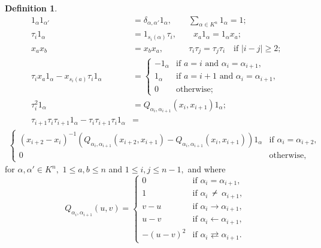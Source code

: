 \documentclass[11pt, reqno]{amsart} \textwidth=14.9cm \oddsidemargin=1cm \evensidemargin=1cm
\theoremstyle{definition}
\newtheorem{definition}[theorem]{Definition}
\def\nslash{\:\notslash\:}
\numberwithin{equation}{section}
\begin{document}
\begin{definition}
\begin{align}
1_{\alpha}1_{\alpha'}&=\delta_{\alpha,\alpha'}1_{\alpha},\qquad\sum_{\alpha\in K^{n}}1_{\alpha}=1;\label{rel-def-QHA1}\\[0.2em]
\tau_{i}1_{\alpha}&=1_{s_{i}(\alpha)}\tau_{i},\qquad x_{a}1_{\alpha}=1_{\alpha}x_{a};\label{rel-def-QHA2}\\[0.2em]
x_{a}x_{b}&=x_{b}x_{a},\qquad \quad \tau_{i}\tau_{j}=\tau_{j}\tau_{i} \quad \mbox{if $\vert i-j\vert \geq 2$;}\label{rel-def-QHA3}\\[0.2em]
\tau_{i}x_{a}1_{\alpha}-x_{s_{i}(a)}\tau_{i}1_{\alpha}&=\left\{
\begin{array}{ll}
-1_{\alpha}&\text{if $a=i$ and $\alpha_i = \alpha_{i+1}$},\\[0.2em]
1_{\alpha}&\text{if $a=i+1$ and $\alpha_i = \alpha_{i+1}$},\\[0.2em]
0&\text{otherwise;}
\end{array}
\right.\label{rel-def-QHA4}\\[0.2em]
\tau_{i}^{2}1_{\alpha}&=Q_{\alpha_i, \alpha_{i+1}}(x_{i}, x_{i+1})1_{\alpha};\label{rel-def-QHA5}\\[0.2em]
\nonumber\tau_{i+1}\tau_{i}\tau_{i+1}1_{\alpha}-\tau_{i}\tau_{i+1}\tau_{i}1_{\alpha}&=\end{align}
\begin{align}
\left\{
\begin{array}{ll}
(x_{i+2}-x_{i})^{-1}(Q_{\alpha_i, \alpha_{i+1}}(x_{i+2}, x_{i+1})-Q_{\alpha_i, \alpha_{i+1}}(x_{i}, x_{i+1}))1_{\alpha}&\text{if $\alpha_i = \alpha_{i+2}$},\\[0.3em]
0&\text{otherwise,}
\end{array}
\right.\label{rel-def-QHA6}
\end{align}
for $\alpha,\alpha'\in K^{n},$ $1\leq a,b\leq n$ and $1\leq i,j\leq n-1,$ and where\\
\[Q_{\alpha_i, \alpha_{i+1}}(u, v)=\left\{
\begin{array}{ll}
0&\text{if $\alpha_i = \alpha_{i+1}$},\\[0.05em]
1&\text{if $\alpha_i\nslash \alpha_{i+1}$},\\[0.05em]
v-u&\text{if $\alpha_i\rightarrow \alpha_{i+1}$},\\[0.05em]
u-v&\text{if $\alpha_i\leftarrow \alpha_{i+1}$},\\[0.05em]
-(u-v)^{2}&\text{if $\alpha_i\rightleftarrows \alpha_{i+1}$}.
\end{array}
\right.\]
\end{definition}
\end{document}
